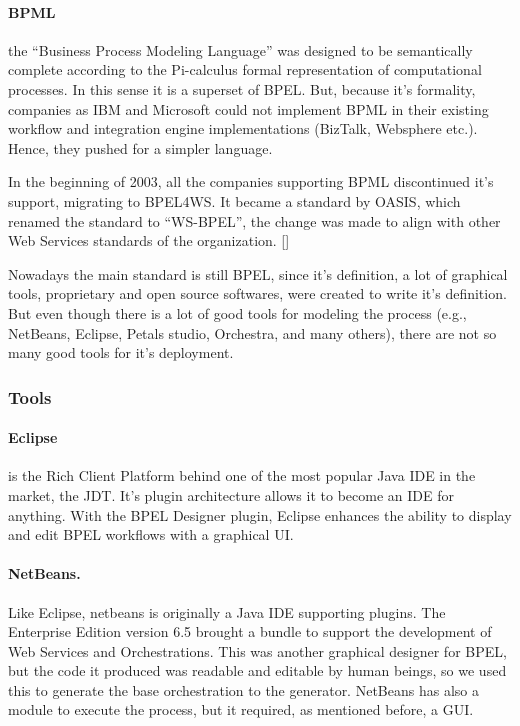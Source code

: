 \paragraph{BPML} 
the ``Business Process Modeling Language'' was designed to be semantically complete according to the Pi-calculus formal representation of computational processes. In this sense it is a superset of BPEL. But, because it's formality, companies as IBM and Microsoft could not implement BPML in their existing workflow and integration engine implementations (BizTalk, Websphere etc.). Hence, they pushed for a simpler language.

In the beginning of 2003, all the companies supporting BPML discontinued it's support, migrating to BPEL4WS. It became a standard by OASIS, which renamed the standard to ``WS-BPEL'', the change was made to align with other Web Services standards of the organization. [\citet{OASIS}]

Nowadays the main standard is still BPEL, since it's definition, a lot of graphical tools, proprietary and open source softwares, were created to write it's definition. But even though there is a lot of good tools for modeling the process (e.g., NetBeans, Eclipse, Petals studio, Orchestra, and many others), there are not so many good tools for it's deployment.

\subsubsection{Tools}

\paragraph{Eclipse}
is the Rich Client Platform behind one of the most popular Java IDE in the market, the JDT. It's plugin architecture allows it to become an IDE for anything. With the BPEL Designer plugin, Eclipse enhances the ability to display and edit BPEL workflows with a graphical UI.

\paragraph{NetBeans.}
Like Eclipse, netbeans is originally a Java IDE supporting plugins. The Enterprise Edition version 6.5 brought a bundle to support the development of Web Services and Orchestrations. This was another graphical designer for BPEL, but the code it produced was readable and editable by human beings, so we used this to generate the base orchestration to the generator. NetBeans has also a module to execute the process, but it required, as mentioned before, a GUI.

